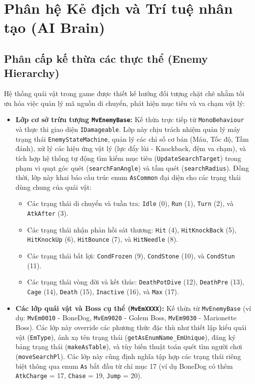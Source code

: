 \documentclass[../DoAn.tex]{subfiles}
\begin{document}
\section{Phân hệ Kẻ địch và Trí tuệ nhân tạo (AI Brain)}
\label{section:4.3}

\subsection{Phân cấp kế thừa các thực thể (Enemy Hierarchy)}
Hệ thống quái vật trong game được thiết kế hướng đối tượng chặt chẽ nhằm tối ưu hóa việc quản lý mã nguồn di chuyển, phát hiện mục tiêu và va chạm vật lý:
\begin{itemize}
    \item \textbf{Lớp cơ sở trừu tượng \texttt{MvEnemyBase}:} Kế thừa trực tiếp từ \texttt{MonoBehaviour} và thực thi giao diện \texttt{IDamageable}. Lớp này chịu trách nhiệm quản lý máy trạng thái \texttt{EnemyStateMachine}, quản lý các chỉ số cơ bản (Máu, Tốc độ, Tầm đánh), xử lý các hiệu ứng vật lý (lực đẩy lùi - Knockback, đệm va chạm), và tích hợp hệ thống tự động tìm kiếm mục tiêu (\texttt{UpdateSearchTarget}) trong phạm vi quạt góc quét (\texttt{searchFanAngle}) và tầm quét (\texttt{searchRadius}). Đồng thời, lớp này khai báo cấu trúc enum \texttt{AsCommon} đại diện cho các trạng thái dùng chung của quái vật:
    \begin{itemize}
        \item Các trạng thái di chuyển và tuần tra: \texttt{Idle} (0), \texttt{Run} (1), \texttt{Turn} (2), và \texttt{AtkAfter} (3).
        \item Các trạng thái nhận phản hồi sát thương: \texttt{Hit} (4), \texttt{HitKnockBack} (5), \texttt{HitKnockUp} (6), \texttt{HitBounce} (7), và \texttt{HitNeedle} (8).
        \item Các trạng thái bất lợi: \texttt{CondFrozen} (9), \texttt{CondStone} (10), và \texttt{CondStun} (11).
        \item Các trạng thái vòng đời và kết thúc: \texttt{DeathPotDive} (12), \texttt{DeathPre} (13), \texttt{Cage} (14), \texttt{Death} (15), \texttt{Inactive} (16), và \texttt{Max} (17).
    \end{itemize}
    \item \textbf{Các lớp quái vật và Boss cụ thể (\texttt{MvEmXXXX}):} Kế thừa từ \texttt{MvEnemyBase} (ví dụ: \texttt{MvEm0010} - BoneDog, \texttt{MvEm9020} - Golem Boss, \texttt{MvEm9030} - Marionette Boss). Các lớp này override các phương thức đặc thù như thiết lập kiểu quái vật (\texttt{EmType}), ánh xạ tên trạng thái (\texttt{getAsEnumName\_EmUnique}), đăng ký bảng trạng thái (\texttt{makeAsTable}), và tùy biến thuật toán quét tìm người chơi (\texttt{moveSearchPl}). Các lớp này cũng định nghĩa tập hợp các trạng thái riêng biệt thông qua enum \texttt{As} bắt đầu từ chỉ mục 17 (ví dụ BoneDog có thêm \texttt{AtkCharge} = 17, \texttt{Chase} = 19, \texttt{Jump} = 20).
\end{itemize}
\end{document}
